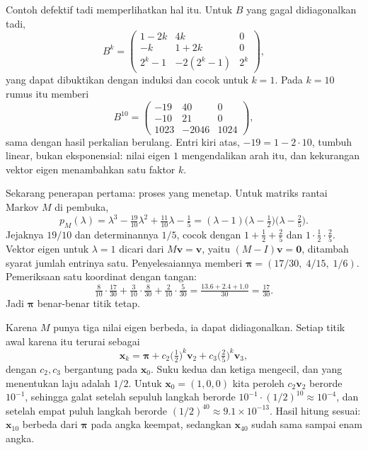 Contoh defektif tadi memperlihatkan hal itu. Untuk $B$ yang gagal didiagonalkan tadi,
\[
  B^{k}=
  \begin{pmatrix}1-2k&4k&0\\ -k&1+2k&0\\ 2^{k}-1&-2(2^{k}-1)&2^{k}\end{pmatrix},
\]
yang dapat dibuktikan dengan induksi dan cocok untuk $k=1$. Pada $k=10$ rumus itu memberi
\[
  B^{10}=\begin{pmatrix}-19&40&0\\ -10&21&0\\ 1023&-2046&1024\end{pmatrix},
\]
sama dengan hasil perkalian berulang. Entri kiri atas, $-19=1-2\cdot10$, tumbuh linear, bukan
eksponensial: nilai eigen $1$ mengendalikan arah itu, dan kekurangan vektor eigen menambahkan satu
faktor $k$.

Sekarang penerapan pertama: proses yang menetap. Untuk matriks rantai Markov $M$ di pembuka,
\[
  p_{M}(\lambda)=\lambda^{3}-\tfrac{19}{10}\lambda^{2}+\tfrac{11}{10}\lambda-\tfrac15
  =(\lambda-1)\bigl(\lambda-\tfrac12\bigr)\bigl(\lambda-\tfrac25\bigr).
\]
Jejaknya $19/10$ dan determinannya $1/5$, cocok dengan $1+\tfrac12+\tfrac25$ dan
$1\cdot\tfrac12\cdot\tfrac25$. Vektor eigen untuk $\lambda=1$ dicari dari $M\mathbf{v}=\mathbf{v}$,
yaitu $(M-I)\mathbf{v}=\mathbf{0}$, ditambah syarat jumlah entrinya satu. Penyelesaiannya memberi
$\boldsymbol{\pi}=(17/30,\;4/15,\;1/6)$. Pemeriksaan satu koordinat dengan tangan:
\[
  \tfrac{8}{10}\cdot\tfrac{17}{30}+\tfrac{3}{10}\cdot\tfrac{8}{30}
  +\tfrac{2}{10}\cdot\tfrac{5}{30}
  =\tfrac{13.6+2.4+1.0}{30}=\tfrac{17}{30}.
\]
Jadi $\boldsymbol{\pi}$ benar-benar titik tetap.

Karena $M$ punya tiga nilai eigen berbeda, ia dapat didiagonalkan. Setiap titik awal karena itu
terurai sebagai
\[
  \mathbf{x}_{k}=\boldsymbol{\pi}+c_{2}\bigl(\tfrac12\bigr)^{k}\mathbf{v}_{2}
  +c_{3}\bigl(\tfrac25\bigr)^{k}\mathbf{v}_{3},
\]
dengan $c_{2},c_{3}$ bergantung pada $\mathbf{x}_{0}$. Suku kedua dan ketiga mengecil, dan yang
menentukan laju adalah $1/2$. Untuk $\mathbf{x}_{0}=(1,0,0)$ kita peroleh $c_{2}\mathbf{v}_{2}$
berorde $10^{-1}$, sehingga galat setelah sepuluh langkah berorde
$10^{-1}\cdot(1/2)^{10}\approx10^{-4}$, dan setelah empat puluh langkah berorde
$(1/2)^{40}\approx9.1\times10^{-13}$. Hasil hitung sesuai: $\mathbf{x}_{10}$ berbeda dari
$\boldsymbol{\pi}$ pada angka keempat, sedangkan $\mathbf{x}_{40}$ sudah sama sampai enam angka.

